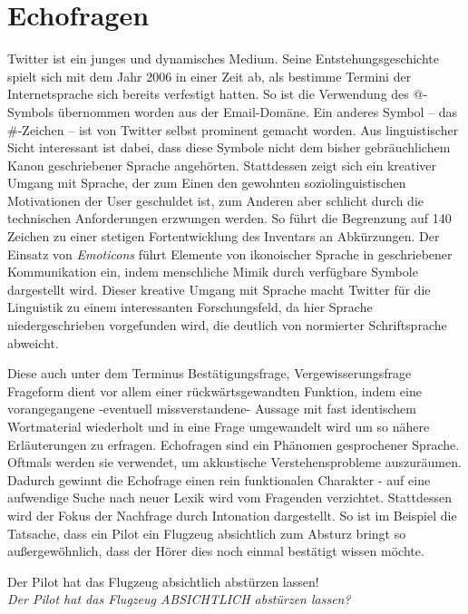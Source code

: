 \documentclass[main.tex]{subfiles}
\begin{document}
\section{Echofragen}

Twitter ist ein junges und dynamisches Medium. Seine Entstehungsgeschichte spielt sich mit dem Jahr 2006 in einer Zeit ab, als bestimme Termini der Internetsprache sich bereits verfestigt hatten. So ist die Verwendung des $@$-Symbols übernommen worden aus der Email-Domäne. Ein anderes Symbol -- das \#-Zeichen -- ist von Twitter selbst prominent gemacht worden. Aus linguistischer Sicht interessant ist dabei, dass diese Symbole nicht dem bisher gebräuchlichem Kanon geschriebener Sprache angehörten. Stattdessen zeigt sich ein kreativer Umgang mit Sprache, der zum Einen den gewohnten soziolinguistischen Motivationen der User geschuldet ist, zum Anderen aber schlicht durch die technischen Anforderungen erzwungen werden. So führt die Begrenzung auf 140 Zeichen zu einer stetigen Fortentwicklung des Inventars an Abkürzungen. Der Einsatz von \textit{Emoticons} führt Elemente von ikonoischer Sprache in geschriebener Kommunikation ein, indem menschliche Mimik durch verfügbare Symbole dargestellt wird. Dieser kreative Umgang mit Sprache macht Twitter für die Linguistik zu einem interessanten Forschungsfeld, da hier Sprache niedergeschrieben vorgefunden wird, die deutlich von normierter Schriftsprache abweicht.

Diese auch unter dem Terminus Bestätigungsfrage, Vergewisserungsfrage Frageform dient vor allem einer rückwärtsgewandten Funktion, indem eine vorangegangene -eventuell missverstandene- Aussage mit fast identischem Wortmaterial wiederholt und in eine Frage umgewandelt wird um so nähere Erläuterungen zu erfragen. Echofragen sind ein Phänomen gesprochener Sprache. Oftmals werden sie verwendet, um akkustische Verstehensprobleme auszuräumen. Dadurch gewinnt die Echofrage einen rein funktionalen Charakter - auf eine aufwendige Suche nach neuer Lexik wird vom Fragenden verzichtet. Stattdessen wird der Fokus der Nachfrage durch Intonation dargestellt. So ist im Beispiel die Tatsache, dass ein Pilot ein Flugzeug absichtlich zum Absturz bringt so außergewöhnlich, dass der Hörer dies noch einmal bestätigt wissen möchte.

\begin{example}
Der Pilot hat das Flugzeug absichtlich abstürzen lassen!\\ 
\textit{Der Pilot hat das Flugzeug ABSICHTLICH abstürzen lassen?}
\end{example}
\end{document}
